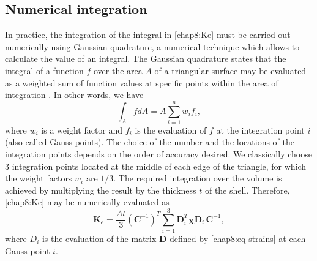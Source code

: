 	\subsection{Numerical integration} \label{chap8:numericalIntegration}
In practice, the integration of the integral in \eqref{chap8:Ke} must be carried out numerically using Gaussian quadrature, a numerical technique which allows to calculate the value of an integral. The Gaussian quadrature states that the integral of a function $ f $ over the area $ A $ of a triangular surface may be evaluated as a weighted sum of function values at specific points within the area of integration \citep{Cowper73}. In other words, we have
\begin{equation}
\int_{A} f dA = A \sum_{i=1}^n w_i f_i,
\end{equation}
where $ w_i $ is a weight factor and $ f_i $ is the evaluation of $ f $ at the integration point $ i $ (also called Gauss points). The choice of the number and the locations of the integration points depends on the order of accuracy desired. We classically choose 3 integration points located at the middle of each edge of the triangle, for which the weight factors $ w_i $ are $ 1/3 $. The required integration over the volume is achieved by multiplying the result by the thickness $ t $ of the shell. Therefore, \eqref{chap8:Ke} may be numerically evaluated as
\begin{equation}
\textbf{K}_e = \dfrac{A t}{3} (\textbf{C}^{-1})^T \sum_{i=1}^3 \textbf{D}_i^{T} \boldsymbol\chi \textbf{D}_i  \, \textbf{C}^{-1},
\end{equation}
where $ D_i $ is the evaluation of the matrix $ \mathbf{D} $ defined by \eqref{chap8:eq-strains} at each Gauss point $ i $. 

\bigskip

